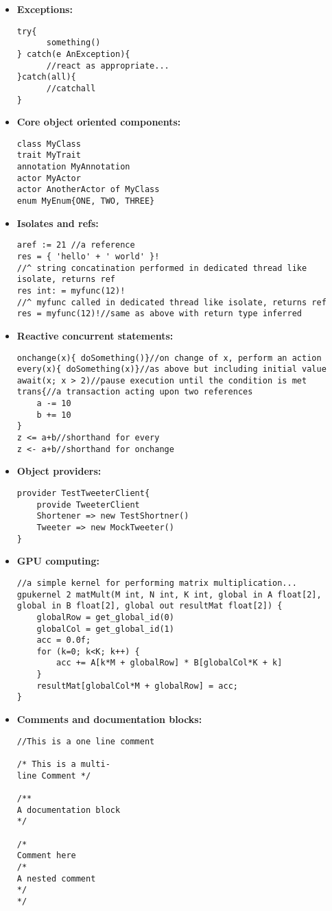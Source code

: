 \documentclass[conc-doc]{subfiles}
\begin{document}
\begin{itemize}
	
	\item \textbf{Exceptions:}
\begin{lstlisting}
try{
	  something()
} catch(e AnException){
	  //react as appropriate...
}catch(all){
	  //catchall
}
\end{lstlisting}

	\item \textbf{Core object oriented components:}
\begin{lstlisting}
class MyClass
trait MyTrait
annotation MyAnnotation
actor MyActor
actor AnotherActor of MyClass
enum MyEnum{ONE, TWO, THREE}
\end{lstlisting}


\item \textbf{Isolates and refs:}
\begin{lstlisting}
aref := 21 //a reference
res = { 'hello' + ' world' }!
//^ string concatination performed in dedicated thread like isolate, returns ref
res int: = myfunc(12)!
//^ myfunc called in dedicated thread like isolate, returns ref
res = myfunc(12)!//same as above with return type inferred
\end{lstlisting}


	\item \textbf{Reactive concurrent statements:}
	\begin{lstlisting}
onchange(x){ doSomething()}//on change of x, perform an action
every(x){ doSomething(x)}//as above but including initial value
await(x; x > 2)//pause execution until the condition is met
trans{//a transaction acting upon two references
	a -= 10
	b += 10
}
z <= a+b//shorthand for every
z <- a+b//shorthand for onchange
	\end{lstlisting}
	
	\item \textbf{Object providers:}
	\begin{lstlisting}
provider TestTweeterClient{
	provide TweeterClient
	Shortener => new TestShortner()
	Tweeter => new MockTweeter()
}
	\end{lstlisting}
	
	\item \textbf{GPU computing:}
	\begin{lstlisting}
//a simple kernel for performing matrix multiplication...
gpukernel 2 matMult(M int, N int, K int, global in A float[2], global in B float[2], global out resultMat float[2]) {
	globalRow = get_global_id(0) 
	globalCol = get_global_id(1) 
	acc = 0.0f;
	for (k=0; k<K; k++) {
		acc += A[k*M + globalRow] * B[globalCol*K + k]
	}
	resultMat[globalCol*M + globalRow] = acc;
} 
\end{lstlisting}

	\item \textbf{Comments and documentation blocks:}
\begin{lstlisting}
//This is a one line comment

/* This is a multi-
line Comment */

/** 
A documentation block 
*/

/*
Comment here
/*
A nested comment
*/
*/	
\end{lstlisting}
	
\end{itemize}
\end{document}
